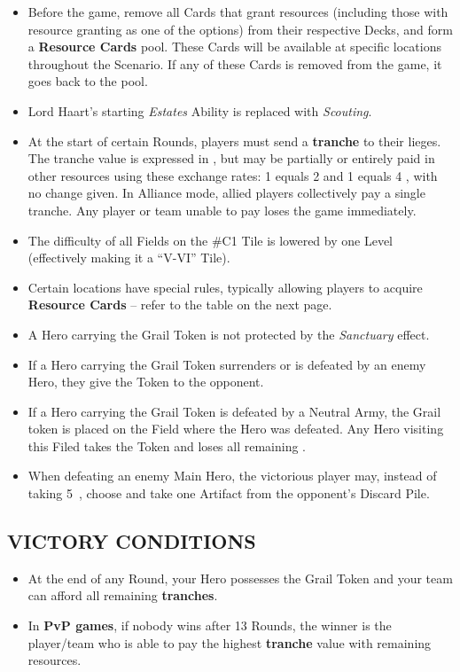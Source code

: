\begin{multicols*}{2}
\begin{itemize}
  \item Before the game, remove all Cards that grant resources (including those with resource granting as one of the options) from their respective Decks, and form a \textbf{Resource Cards} pool. These Cards will be available at specific locations throughout the Scenario. If any of these Cards is removed from the game, it goes back to the pool.
  \item Lord Haart's starting \textit{Estates} Ability is replaced with \textit{Scouting}.
  \item At the start of certain Rounds, players must send a \textbf{tranche} to their lieges. The tranche value is expressed in , but may be partially or entirely paid in other resources using these exchange rates: 1  equals 2  and 1  equals 4 , with no change given. In Alliance mode, allied players collectively pay a single tranche. Any player or team unable to pay loses the game immediately.
  \item The difficulty of all Fields on the \#C1 Tile is lowered by one Level (effectively making it a ``V-VI'' Tile).
  \item Certain locations have special rules, typically allowing players to acquire \textbf{Resource Cards} -- refer to the table on the next page.
  \item A Hero carrying the Grail Token is not protected by the \textit{Sanctuary} effect.
  \item If a Hero carrying the Grail Token surrenders or is defeated by an enemy Hero, they give the Token to the opponent.
  \item If a Hero carrying the Grail Token is defeated by a Neutral Army, the Grail token is placed on the Field where the Hero was defeated. Any Hero visiting this Filed takes the Token and loses all remaining .
  \item When defeating an enemy Main Hero, the victorious player may, instead of taking \mbox{5 }, choose and take one Artifact from the opponent's Discard Pile.
\end{itemize}

\subsection*{\MakeUppercase{Victory Conditions}}

\begin{itemize}
  \item At the end of any Round, your Hero possesses the Grail Token and your team can afford all remaining \textbf{tranches}.
  \item In \textbf{PvP games}, if nobody wins after 13 Rounds, the winner is the player/team who is able to pay the highest \textbf{tranche} value with remaining resources.
\end{itemize}


\end{multicols*}
